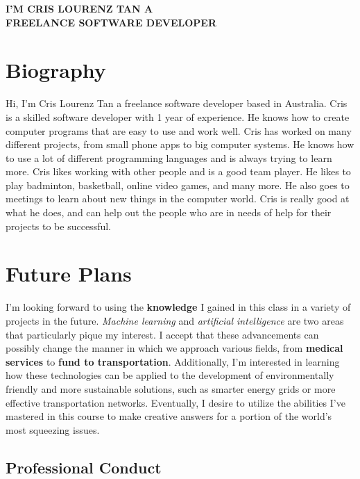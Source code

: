 \documentclass{article}
\begin{document}
\begin{center} \textbf {I'M CRIS LOURENZ TAN A \\ FREELANCE SOFTWARE DEVELOPER} \end{center}



\section{Biography}



Hi, I'm Cris Lourenz Tan a freelance software developer based in Australia. Cris is a skilled software developer with 1 year of experience. He knows how to create computer programs that are easy to use and work well. Cris has worked on many different projects, from small phone apps to big computer systems. He knows how to use a lot of different programming languages and is always trying to learn more. Cris likes working with other people and is a good team player. He likes to play badminton, basketball, online video games, and many more. He also goes to meetings to learn about new things in the computer world. Cris is really good at what he does, and can help out the people who are in needs of help for their projects to be successful.





\section{Future Plans}



I'm looking forward to using the \textbf{knowledge} I gained in this class in a variety of projects in the future. \emph{Machine learning} and \emph{artificial intelligence} are two areas that particularly pique my interest. I accept that these advancements can possibly change the manner in which we approach various fields, from \textbf{medical services} to \textbf{fund to transportation}. Additionally, I'm interested in learning how these technologies can be applied to the development of environmentally friendly and more sustainable solutions, such as smarter energy grids or more effective transportation networks. Eventually, I desire to utilize the abilities I've mastered in this course to make creative answers for a portion of the world's most squeezing issues.





\subsection{Professional Conduct}
\end{document}
